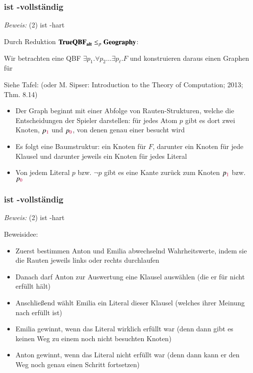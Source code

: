 \documentclass[aspectratio=1610,onlymath]{beamer}
\begin{document}
\begin{frame}[t]\frametitle{ ist \PSpace-vollständig }

\vspace{-1ex}
\pause

\emph{Beweis:} (2)  ist \PSpace-hart\pause
\smallskip

Durch Reduktion $\textbf{\textcolor{black}{TrueQBF}}_{\textbf{\textcolor{black}{alt}}}\leq_p \textbf{\textcolor{black}{Geography}}$:

Wir betrachten eine QBF $\exists p_1.\forall p_2\ldots \exists p_\ell. F$
und konstruieren daraus einen Graphen für  \bigskip

\alert{Siehe Tafel:} {\tiny (oder M. Sipser: Introduction to the Theory of Computation; 2013; Thm. 8.14)}
\begin{itemize}
\item Der Graph beginnt mit einer Abfolge von Rauten-Strukturen, welche die 
Entscheidungen der Spieler darstellen: für jedes Atom $p$ gibt es dort zwei Knoten, $p_{\textcolor{purple}{1}}$ und $p_{\textcolor{purple}{0}}$, von denen genau einer besucht wird
\item Es folgt eine Baumstruktur: ein Knoten für $F$, darunter ein Knoten für jede Klausel und darunter jeweils ein Knoten für jedes Literal
\item Von jedem Literal $p$ bzw. $\neg p$ gibt es eine Kante zurück zum Knoten $p_{\textcolor{purple}{1}}$ bzw. $p_{\textcolor{purple}{0}}$
\end{itemize}


\end{frame}

\begin{frame}[t]\frametitle{ ist \PSpace-vollständig }

\vspace{-1ex}

\emph{Beweis:} (2)  ist \PSpace-hart
\smallskip

Beweisidee:
\begin{itemize}
\item Zuerst bestimmen Anton und Emilia abwechselnd Wahrheitswerte, indem sie die Rauten
jeweils links oder rechts durchlaufen
\item Danach darf Anton zur Auswertung eine Klausel auswählen (die er für nicht erfüllt hält)
\item Anschließend wählt Emilia ein Literal dieser Klausel (welches ihrer Meinung nach erfüllt ist)
\item Emilia gewinnt, wenn das Literal wirklich erfüllt war (denn dann gibt es keinen Weg zu einem noch nicht besuchten Knoten)
\item Anton gewinnt, wenn das Literal nicht erfüllt war (denn dann kann er den Weg noch genau einen Schritt fortsetzen)
\end{itemize}

\end{frame}
\end{document}
